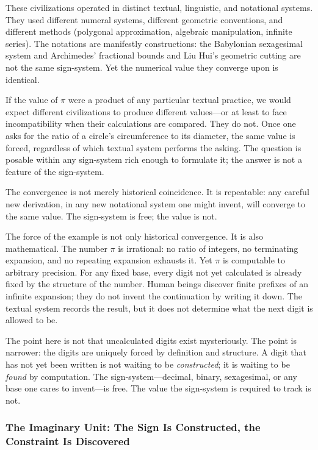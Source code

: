 \documentclass[a4paper,twocolumn,11pt]{article}
\begin{document}
These civilizations operated in distinct textual, linguistic, and notational systems. They used different numeral systems, different geometric conventions, and different methods (polygonal approximation, algebraic manipulation, infinite series). The notations are manifestly constructions: the Babylonian sexagesimal system and Archimedes' fractional bounds and Liu Hui's geometric cutting are not the same sign-system. Yet the numerical value they converge upon is identical.

If the value of $\pi$ were a product of any particular textual practice, we would expect different civilizations to produce different values---or at least to face incompatibility when their calculations are compared. They do not. Once one asks for the ratio of a circle's circumference to its diameter, the same value is forced, regardless of which textual system performs the asking. The question is posable within any sign-system rich enough to formulate it; the answer is not a feature of the sign-system.

The convergence is not merely historical coincidence. It is repeatable: any careful new derivation, in any new notational system one might invent, will converge to the same value. The sign-system is free; the value is not.

The force of the example is not only historical convergence. It is also mathematical. The number $\pi$ is irrational: no ratio of integers, no terminating expansion, and no repeating expansion exhausts it. Yet $\pi$ is computable to arbitrary precision. For any fixed base, every digit not yet calculated is already fixed by the structure of the number. Human beings discover finite prefixes of an infinite expansion; they do not invent the continuation by writing it down. The textual system records the result, but it does not determine what the next digit is allowed to be.

The point here is not that uncalculated digits exist mysteriously. The point is narrower: the digits are uniquely forced by definition and structure. A digit that has not yet been written is not waiting to be \emph{constructed}; it is waiting to be \emph{found} by computation. The sign-system---decimal, binary, sexagesimal, or any base one cares to invent---is free. The value the sign-system is required to track is not.

\subsubsection*{The Imaginary Unit: The Sign Is Constructed, the Constraint Is Discovered}
\end{document}
